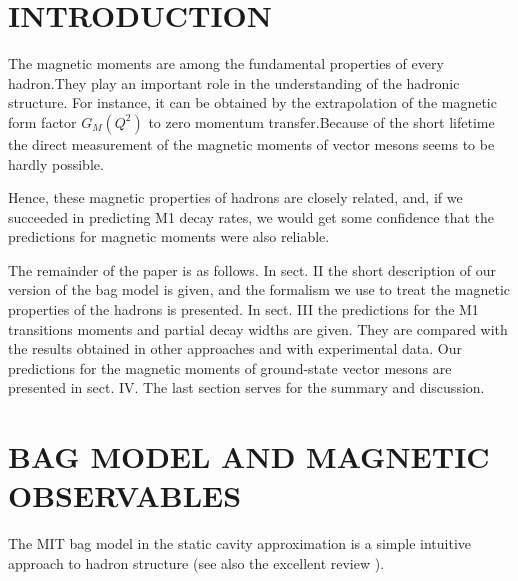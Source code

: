 \documentclass[12pt,epsf]{article}
\begin{document}
\begin{multicols}{2}%
\section{\small\bf INTRODUCTION}

The magnetic moments are among the fundamental properties of every hadron.They play an important role in the understanding of the hadronic structure. For instance, it can be obtained by the extrapolation of the magnetic form factor \( G_M(Q^2) \) to zero momentum transfer.Because of the short lifetime the direct measurement of the magnetic moments of vector mesons seems to be hardly possible.

Hence, these magnetic properties of hadrons are closely related, and, if we succeeded in predicting M1 decay rates, we would get some confidence that the predictions for magnetic moments were also reliable.

The remainder of the paper is as follows. In sect. II the short description of our version of the bag model is given, and the formalism we use to treat the magnetic properties of the hadrons is presented. In sect. III the predictions for the M1 transitions moments and partial decay widths are given. They are compared with the results obtained in other approaches and with experimental data. Our predictions for the magnetic moments of ground-state vector mesons are presented in sect. IV. The last section serves for the summary and discussion.

\section{\small\bf BAG MODEL AND MAGNETIC OBSERVABLES}

The MIT bag model in the static cavity approximation \cite{Pritchett:1971np} is a simple intuitive approach to hadron structure (see also the excellent review \cite{Ishida:1979tw}). 


\end{multicols}
\end{document}
